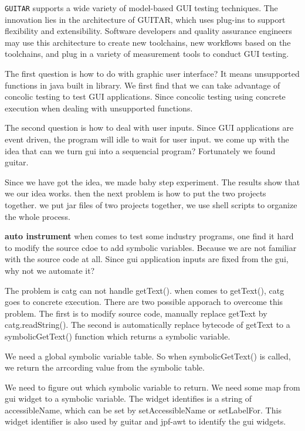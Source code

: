 \documentclass{article}
\begin{document}
\texttt{GUITAR} supports a wide variety of model-based GUI testing techniques. The innovation lies in the architecture of GUITAR, which uses plug-ins to support flexibility and extensibility. Software developers and quality assurance engineers may use this architecture to create new toolchains, new workflows based on the toolchains, and plug in a variety of measurement tools to conduct GUI testing.

The first question is how to do with graphic user interface? It means unsupported functions in java built in library.
We first find that we can take advantage of concolic testing to test GUI applications. Since concolic testing using concrete execution when dealing with unsupported functions.

The second question is how to deal with user inputs. Since GUI applications are event driven, the program will idle to wait for user input. we come up with the idea that can we turn gui into a sequencial program? Fortunately we found guitar.

Since we have got the idea, we made baby step experiment. The results show that we our idea works. then the next problem is how to put the two projects together. we put jar files of two projects together, we use shell scripts to organize the whole process.

\textbf{auto instrument} when comes to test some industry programs, one find it hard to modify the source cdoe to add symbolic variables. Because we are not familiar with the source code at all. Since gui application inputs are fixed from the gui, why not we automate it?

The problem is catg can not handle getText(). when comes to getText(), catg goes to concrete execution. There are two possible apporach to overcome this problem. The first is to modify source code, manually replace getText by catg.readString(). The second is automatically replace bytecode of getText to a symbolicGetText() function which returns a symbolic variable.

We need a global symbolic variable table. So when symbolicGetText() is called, we return the arrcording value from the symbolic table.

We need to figure out which symbolic variable to return. We need some map from gui widget to a symbolic variable. The widget identifies is a string of accessibleName, which can be set by setAccessibleName or setLabelFor. This widget identifier is also used by guitar and jpf-awt to identify the gui widgets.
\end{document}
